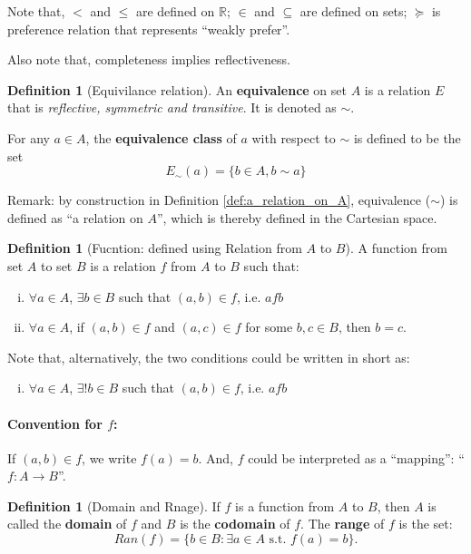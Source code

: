 \documentclass[12pt]{article}
\newcommand{\R}{{\mathbb R}}
\theoremstyle{definition}
\newtheorem{definition}[theorem]{Definition}
\theoremstyle{plain}
\begin{document}
Note that, $<$ and $\le$ are defined on $\R$; $\in$ and $\subseteq$ are 
defined on sets; $\succeq$ is preference relation that represents ``weakly 
prefer''.

Also note that, completeness implies reflectiveness.

\begin{definition}
    [Equivilance relation]

    An \textbf{equivalence} on set $A$ is a relation $E$ that is 
    \emph{reflective, symmetric and transitive}. It is denoted as $\sim$.

    For any $a \in A$, the \textbf{equivalence class} of $a$ with respect to 
    $\sim$ is defined to be the set 
    \[E_\sim(a) = \{ b \in A, b\sim a\}\]
\end{definition}

Remark: by construction in Definition \ref{def:a_relation_on_A},  equivalence 
($\sim$) is defined as ``a relation on $A$'', which is thereby defined in the 
Cartesian space.

\begin{definition}
    [Fucntion: defined using Relation from $A$ to $B$]
    A function from set $A$ to set $B$ is a relation $f$ from $A$ to $B$ such 
    that: 
    \begin{enumerate}[(i)]
        \item $\forall a \in A$, $\exists b \in B$ such that $(a,b) \in f$, i.e. 
            $a f b$
        \item $\forall a \in A$, if $(a,b) \in f$ and $(a,c) \in f$ for some $b, 
            c \in B$, then $b = c$.
    \end{enumerate}

    Note that, alternatively, the two conditions could be written in short as: 
    \begin{enumerate}[(iii)]
        \item $\forall a \in A$, $\exists ! b \in B$ such that $(a,b) \in f$, i.e. 
            $a f b$
    \end{enumerate}

\end{definition}
\paragraph{Convention for $f$:} If $(a,b) \in f$, we write $f(a) = b$. And, $f$ 
could be interpreted as a ``mapping'': ``$f: A\to B$''.

\begin{definition}[Domain and Rnage]
    If $f$ is a function from $A$ to $B$, then $A$ is called the 
    \textbf{domain } of $f$ and $B$ is the \textbf{codomain} of $f$. The 
    \textbf{range} of $f$ is the set:
    \[
        Ran (f) = \{ b \in B: \exists a \in A 
        \text{ s.t. } f(a) = b\}.
    \]
\end{definition}
\end{document}
